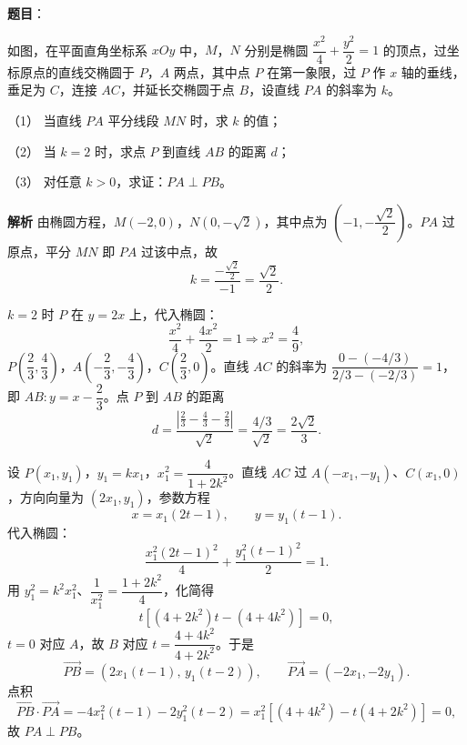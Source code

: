 \begin{answer}

\textbf{题目}：

如图，在平面直角坐标系 $xOy$ 中，$M$，$N$ 分别是椭圆 $\dfrac{x^2}4+\dfrac{y^2}2=1$ 的顶点，过坐标原点的直线交椭圆于 $P$，$A$ 两点，其中点 $P$ 在第一象限，过 $P$ 作 $x$ 轴的垂线，垂足为 $C$，连接 $AC$，并延长交椭圆于点 $B$，设直线 $PA$ 的斜率为 $k$。

（1） 当直线 $PA$ 平分线段 $MN$ 时，求 $k$ 的值；

（2） 当 $k=2$ 时，求点 $P$ 到直线 $AB$ 的距离 $d$；

（3） 对任意 $k>0$，求证：$PA\perp PB$。
\nopagebreak[4]
\begin{center}\end{center}
\nopagebreak[4]
\textbf{解析}
由椭圆方程，$M(-2,0)$，$N(0,-\sqrt2)$，其中点为 $\left(-1,-\dfrac{\sqrt2}2\right)$。$PA$ 过原点，平分 $MN$ 即 $PA$ 过该中点，故
\nopagebreak[4]
\[k=\frac{-\frac{\sqrt2}2}{-1}=\frac{\sqrt2}2.\]

$k=2$ 时 $P$ 在 $y=2x$ 上，代入椭圆：
\nopagebreak[4]
\[\frac{x^2}4+\frac{4x^2}2=1\Longrightarrow x^2=\frac49,\]
$P\left(\dfrac23,\dfrac43\right)$，$A\left(-\dfrac23,-\dfrac43\right)$，$C\left(\dfrac23,0\right)$。直线 $AC$ 的斜率为 $\dfrac{0-(-4/3)}{2/3-(-2/3)}=1$，即 $AB:y=x-\dfrac23$。点 $P$ 到 $AB$ 的距离
\nopagebreak[4]
\[d=\frac{\left|\frac23-\frac43-\frac23\right|}{\sqrt2}=\frac{4/3}{\sqrt2}=\frac{2\sqrt2}3.\]

设 $P(x_1,y_1)$，$y_1=kx_1$，$x_1^2=\dfrac{4}{1+2k^2}$。直线 $AC$ 过 $A(-x_1,-y_1)$、$C(x_1,0)$，方向向量为 $(2x_1,y_1)$，参数方程
\nopagebreak[4]
\[x=x_1(2t-1),\qquad y=y_1(t-1).\]
代入椭圆：
\nopagebreak[4]
\[\frac{x_1^2(2t-1)^2}4+\frac{y_1^2(t-1)^2}2=1.\]
用 $y_1^2=k^2x_1^2$、$\dfrac1{x_1^2}=\dfrac{1+2k^2}4$，化简得
\nopagebreak[4]
\[t\left[(4+2k^2)t-(4+4k^2)\right]=0,\]
$t=0$ 对应 $A$，故 $B$ 对应 $t=\dfrac{4+4k^2}{4+2k^2}$。于是
\nopagebreak[4]
\[\overrightarrow{PB}=\left(2x_1(t-1),\,y_1(t-2)\right),\qquad \overrightarrow{PA}=(-2x_1,-2y_1).\]
点积
\nopagebreak[4]
\[\overrightarrow{PB}\cdot\overrightarrow{PA}=-4x_1^2(t-1)-2y_1^2(t-2)
=x_1^2\left[(4+4k^2)-t(4+2k^2)\right]=0,\]
故 $PA\perp PB$。




\end{answer}
